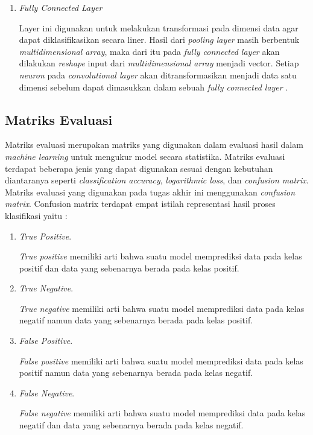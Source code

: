 \begin{enumerate}
  \item \textit{Fully Connected Layer} \par
  Layer ini digunakan untuk melakukan transformasi pada dimensi data agar dapat diklasifikasikan secara liner.
  Hasil dari \textit{pooling layer} masih berbentuk \textit{multidimensional array}, maka dari itu pada \textit{fully connected layer} akan dilakukan \textit{reshape} input dari \textit{multidimensional array} menjadi vector. Setiap \textit{neuron} pada \textit{convolutional layer} akan ditransformasikan menjadi data satu dimensi sebelum dapat dimasukkan dalam sebuah \textit{fully connected layer} \parencite{JurnalTeknikITS}.
\end{enumerate} 

\subsection{Matriks Evaluasi}
Matriks evaluasi merupakan matriks yang digunakan dalam evaluasi hasil dalam \emph{machine learning} untuk mengukur model secara statistika. Matriks evaluasi terdapat beberapa jenis yang dapat digunakan sesuai dengan kebutuhan diantaranya seperti \emph{classification accuracy}, \emph{logarithmic loss}, dan \emph{confusion matrix}. Matriks evaluasi yang digunakan pada tugas akhir ini menggunakan \emph{confusion matrix}. Confusion matrix terdapat empat istilah representasi hasil proses klasifikasi yaitu :
\begin{enumerate}
  \item \emph{True Positive}. \par
  \emph{True positive} memiliki arti bahwa suatu model memprediksi data pada kelas positif dan data yang sebenarnya berada pada kelas positif.
  \item \emph{True Negative}. \par
  \emph{True negative} memiliki arti bahwa suatu model memprediksi data pada kelas negatif namun data yang sebenarnya berada pada kelas positif.
  \item \emph{False Positive}. \par
  \emph{False positive} memiliki arti bahwa suatu model memprediksi data pada kelas positif namun data yang sebenarnya berada pada kelas negatif.
  \item \emph{False Negative}. \par
  \emph{False negative} memiliki arti bahwa suatu model memprediksi data pada kelas negatif dan data yang sebenarnya berada pada kelas negatif.
\end{enumerate}

